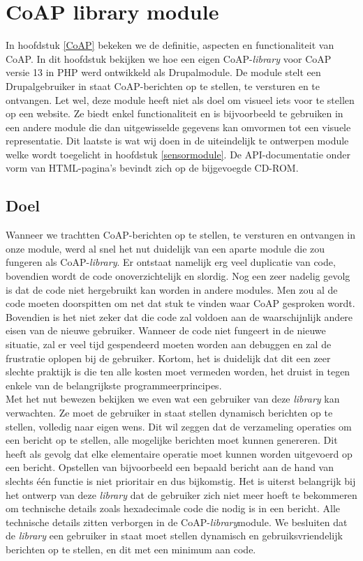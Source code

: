 \chapter{CoAP library module} \label{coaplibrary}

In hoofdstuk \ref{CoAP} bekeken we de definitie, aspecten en functionaliteit van CoAP. In dit hoofdstuk bekijken we hoe een eigen CoAP-\textit{library} voor CoAP versie 13 in PHP werd ontwikkeld als Drupalmodule. De module stelt een Drupalgebruiker in staat CoAP-berichten op te stellen, te versturen en te ontvangen. Let wel, deze module heeft niet als doel om visueel iets voor te stellen op een website. Ze biedt enkel functionaliteit en is bijvoorbeeld te gebruiken in een andere module die dan uitgewisselde gegevens kan omvormen tot een visuele representatie. Dit laatste is wat wij doen in de uiteindelijk te ontwerpen module welke wordt toegelicht in hoofdstuk \ref{sensormodule}. De API-documentatie onder vorm van HTML-pagina's bevindt zich op de bijgevoegde CD-ROM.
\section{Doel}

Wanneer we trachtten CoAP-berichten op te stellen, te versturen en ontvangen in onze module, werd al snel het nut duidelijk van een aparte module die zou fungeren als CoAP-\textit{library}. Er ontstaat namelijk erg veel duplicatie van code, bovendien wordt de code onoverzichtelijk en slordig. Nog een zeer nadelig gevolg is dat de code niet hergebruikt kan worden in andere modules. Men zou al de code moeten doorspitten om net dat stuk te vinden waar CoAP gesproken wordt. Bovendien is het niet zeker dat die code zal voldoen aan de waarschijnlijk andere eisen van de nieuwe gebruiker. Wanneer de code niet fungeert in de nieuwe situatie, zal er veel tijd gespendeerd moeten worden aan debuggen en zal de frustratie oplopen bij de gebruiker. Kortom, het is duidelijk dat dit een zeer slechte praktijk is die ten alle kosten moet vermeden worden, het druist in tegen enkele van de belangrijkste programmeerprincipes.\\

\newpage
Met het nut bewezen bekijken we even wat een gebruiker van deze \textit{library} kan verwachten. Ze moet de gebruiker in staat stellen dynamisch berichten op te stellen, volledig naar eigen wens. Dit wil zeggen dat de verzameling operaties om een bericht op te stellen, alle mogelijke berichten moet kunnen genereren. Dit heeft als gevolg dat elke elementaire operatie moet kunnen worden uitgevoerd op een bericht. Opstellen van bijvoorbeeld een bepaald bericht aan de hand van slechts \'{e}\'{e}n functie is niet prioritair en dus bijkomstig. Het is uiterst belangrijk bij het ontwerp van deze \textit{library} dat de gebruiker zich niet meer hoeft te bekommeren om technische details zoals hexadecimale code die nodig is in een bericht. Alle technische details zitten verborgen in de CoAP-\textit{library}module. We besluiten dat de \textit{library} een gebruiker in staat moet stellen dynamisch en gebruiksvriendelijk berichten op te stellen, en dit met een minimum aan code.

